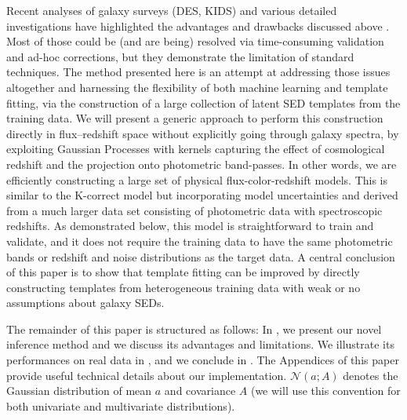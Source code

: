 \documentclass[aps,prd,showpacs,superscriptaddress,groupedaddress]{revtex4}  %
\begin{document}
Recent analyses of galaxy surveys (DES, KIDS) and various detailed \photoz investigations have highlighted the advantages and drawbacks discussed above \citep[see \eg][]{Newman:2013cac, Dahlen:2013fea, Sanchez:2014zgq, Schmidt:2014ela, Bonnett:2015pww}. 
Most of those could be (and are being) resolved via time-consuming validation and ad-hoc corrections, but they demonstrate the limitation of standard \photoz techniques.
The method presented here is an attempt at addressing those issues altogether and harnessing the flexibility of both machine learning and template fitting, via the construction of a large collection of latent SED templates from the training data.
We will present a generic approach to perform this construction directly in flux--redshift space without explicitly going through galaxy spectra, by exploiting Gaussian Processes with kernels capturing the effect of cosmological redshift and the projection onto photometric band-passes.
In other words, we are efficiently constructing a large set of physical flux-color-redshift models.
This is similar to the K-correct model \citep{Blanton:2007} but incorporating model uncertainties and derived from a much larger data set consisting of photometric data with spectroscopic redshifts.
As demonstrated below, this model is straightforward to train and validate, and it does not require the training data to have the same photometric bands or redshift and noise distributions as the target data.
A central conclusion of this paper is to show that template fitting can be improved by directly constructing templates from heterogeneous training data with weak or no assumptions about galaxy SEDs.


The remainder of this paper is structured as follows: In , we present our novel \photoz inference method and we discuss its advantages and limitations. We illustrate its performances on real data in , and we conclude in . The Appendices of this paper provide useful technical details about our implementation. $\mathcal{N}(a;A)$ denotes the Gaussian distribution of mean $a$ and covariance $A$ (we will use this convention for both univariate and multivariate distributions).
\end{document}
